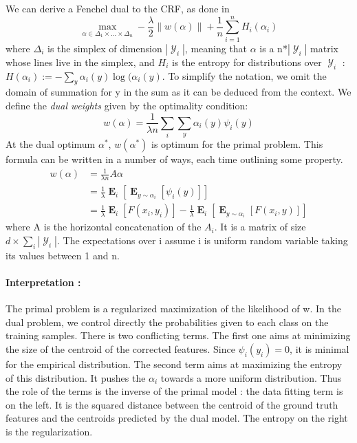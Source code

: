 \documentclass{article}
\DeclareMathOperator{\1}{\mathbb{1}}
\DeclareMathOperator{\E}{\mathbf{E}}
\DeclareMathOperator{\Y}{\mathcal{Y}}
\begin{document}
We can derive a Fenchel dual to the CRF, as done in 
\begin{equation}
	\max_{\alpha\in\Delta_{1} \times \dots \times \Delta_{n}} -\frac{\lambda}{2}\|w(\alpha)\| +\frac{1}{n} \sum_{i=1}^n H_i(\alpha_i)
\end{equation}
where $\Delta_i$ is the simplex of dimension $|\Y_i|$, meaning that $\alpha$ is a n*$|\Y_i|$ matrix whose lines live in the simplex, and $H_i$ is the entropy for distributions over $\Y_i$ : $H(\alpha_i) := - \sum_y \alpha_i(y) \log(\alpha_i(y)$.
To simplify the notation, we omit the domain of summation for y in the sum as it can be deduced from the context.
We define the \textit{dual weights} given by the optimality condition:
\begin{equation*}
	w(\alpha) = \frac{1}{\lambda n} \sum_i \sum_y \alpha_i(y) \psi_i(y) 
\end{equation*}
At the dual optimum $\alpha^*$, $w(\alpha^*)$ is optimum for the primal problem.
This formula can be written in a number of ways, each time outlining some property.
\begin{align}
	w(\alpha) & = \frac{1}{\lambda n} A \alpha \label{linear combination of probabilities} \\
	 & = \frac{1}{\lambda} \E_{i} [ \E_{y \sim \alpha_i} [\psi_i(y)]] \label{mean of the corrected features} \\
	 & =   \frac{1}{\lambda} \E_{i} [F(x_i, y_i)] - \frac{1}{\lambda} \E_{i} [ \E_{y \sim \alpha_i} [F(x_i, y)]]
	 \label{difference between ground truth and dual weights}
\end{align}
where A is the horizontal concatenation of the $A_i$.
It is a matrix of size $d \times \sum_i |\Y_i|$.
The expectations over i assume i is uniform random variable taking its values between 1 and n. 

\paragraph{Interpretation :} The primal problem is a regularized maximization of the likelihood of w. 
In the dual problem, we control directly the probabilities given to each class on the training samples.
There is two conflicting terms.
The first one aims at minimizing the size of the centroid of the corrected features.
Since $\psi_i(y_i)=0$, it is minimal for the empirical distribution.
The second term aims at maximizing the entropy of this distribution.
It pushes the $\alpha_i$ towards a more uniform distribution.
Thus the role of the terms is the inverse of the primal model : the data fitting term is on the left.
It is the squared distance between the centroid of the ground truth features and the centroids predicted by the dual model.
The entropy on the right is the regularization. 
\end{document}
